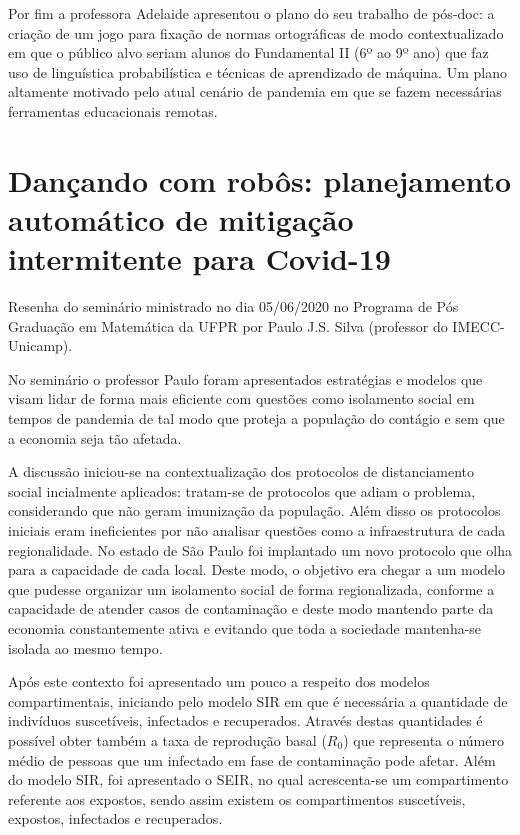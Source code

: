 \documentclass[
	12pt,				%
	openright,			%
	twoside,			%
	a4paper,			%
	english,			%
	brazil,				%
	svgnames
	]{abntex2}\usepackage[]{graphicx}\usepackage[]{color}
\begin{document}
Por fim a professora Adelaide apresentou o plano do seu trabalho de pós-doc: a criação de um jogo para fixação de normas ortográficas de modo contextualizado em que o público alvo seriam alunos do Fundamental II (6º ao 9º ano) que faz uso de linguística probabilística e técnicas de aprendizado de máquina. Um plano altamente motivado pelo atual cenário de pandemia em que se fazem necessárias ferramentas educacionais remotas.

\chapter{Dançando com robôs: planejamento automático de mitigação intermitente para Covid-19}
\label{cap:res7}


Resenha do seminário ministrado no dia 05/06/2020 no Programa de Pós Graduação em Matemática da UFPR por Paulo J.S. Silva (professor do IMECC-Unicamp).

No seminário o professor Paulo foram apresentados estratégias e modelos que visam lidar de forma mais eficiente com questões como isolamento social em tempos de pandemia de tal modo que proteja a população do contágio e sem que a economia seja tão afetada. 

A discussão iniciou-se na contextualização dos protocolos de distanciamento social incialmente aplicados: tratam-se de protocolos que adiam o problema, considerando que não geram imunização da população. Além disso  os protocolos iniciais eram ineficientes por não analisar questões como a infraestrutura de cada regionalidade. No estado de São Paulo foi implantado um novo protocolo que olha para a capacidade de cada local. Deste modo, o objetivo era chegar a um modelo que pudesse organizar um isolamento social de forma regionalizada, conforme a capacidade de atender casos de contaminação e deste modo mantendo parte da economia constantemente ativa e evitando que toda a sociedade mantenha-se isolada ao mesmo tempo.

Após este contexto foi apresentado um pouco a respeito dos modelos compartimentais, iniciando pelo modelo SIR em que é necessária a quantidade de indivíduos suscetíveis, infectados e recuperados. Através destas quantidades é possível obter também a taxa de reprodução basal ($R_0$) que representa o número médio de pessoas que um infectado em fase de contaminação pode afetar. Além do modelo SIR, foi apresentado o SEIR, no qual acrescenta-se um compartimento referente aos expostos, sendo assim existem os compartimentos suscetíveis, expostos, infectados e recuperados.
\end{document}

